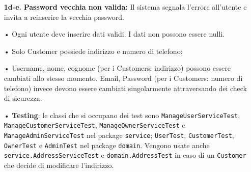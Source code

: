 \documentclass{article}
\begin{document}
{\begin{enumerate}[nosep, leftmargin=25px]
			\begin{enumerate}[nosep, leftmargin=1px]
				\item[i.] L'utente naviga su "Cambia password"; 
				\item[ii.] Il sistema mostra una pagina dedicata per il cambio password;
				\item[iii.] L'utente inserisce la nuova e la vecchia password;
				\item[iv.] Il sistema verifica la password vecchia;
				\item[v.] Il sistema aggiorna la password nel database e mostra un messaggio di conferma all'utente.
			\end{enumerate}
			\item[\textbf{1d-e.}] \textbf{Password vecchia non valida:} Il sistema segnala l'errore all'utente e invita a reinserire la vecchia password.
		\end{enumerate}
	}
	{
		\begin{enumerate}[nosep, leftmargin=*]
			\item[•] Ogni utente deve inserire dati validi. I dati non possono essere nulli.
			\item[•] Solo Customer possiede indirizzo e numero di telefono;
			\item[•] Username, nome, cognome (per i Customers: indirizzo) possono essere cambiati allo stesso momento. Email, Password (per i Customers: numero di telefono) invece devono essere cambiati singolarmente attraversando dei check di sicurezza.
		\end{enumerate}
		
		
		\begin{enumerate}[leftmargin=*]
			\item[•] \textbf{Testing}: le classi che si occupano dei test sono \texttt{ManageUserServiceTest}, \texttt{ManageCustomerServiceTest}, \texttt{ManageOwnerServiceTest} e \texttt{ManageAdminServiceTest} nel package \texttt{service}; \texttt{UserTest}, \texttt{CustomerTest}, \texttt{OwnerTest} e \texttt{AdminTest} nel package \texttt{domain}. \newline Vengono usate anche \texttt{service.AddressServiceTest} e \texttt{domain.AddressTest} in caso di un \texttt{Customer} che decide di modificare l'indirizzo.
		\end{enumerate}
	}
	
	\newpage
	
\end{document}
